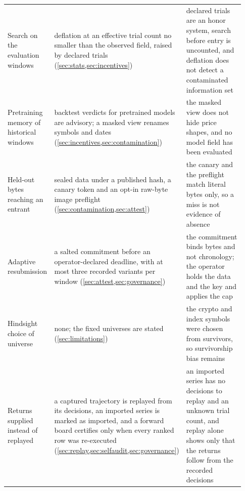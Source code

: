 \begin{table}[t]
\begin{tabular}{>{\raggedright\arraybackslash}p{0.2\linewidth}>{\raggedright\arraybackslash}p{0.37\linewidth}>{\raggedright\arraybackslash}p{0.36\linewidth}}
Search on the evaluation windows & deflation at an effective trial count no smaller than the observed field, raised by declared trials (\cref{sec:stats,sec:incentives}) & declared trials are an honor system, search before entry is uncounted, and deflation does not detect a contaminated information set \citep[p.~7]{gencay2026survives} \\[2pt]
Pretraining memory of historical windows & backtest verdicts for pretrained models are advisory; a masked view renames symbols and dates (\cref{sec:incentives,sec:contamination}) & the masked view does not hide price shapes, and no model field has been evaluated \\[2pt]
Held-out bytes reaching an entrant & sealed data under a published hash, a canary token and an opt-in raw-byte image preflight (\cref{sec:contamination,sec:attest}) & the canary and the preflight match literal bytes only, so a miss is not evidence of absence \\[2pt]
Adaptive resubmission & a salted commitment before an operator-declared deadline, with at most three recorded variants per window (\cref{sec:attest,sec:governance}) & the commitment binds bytes and not chronology; the operator holds the data and the key and applies the cap \\[2pt]
Hindsight choice of universe & none; the fixed universes are stated (\cref{sec:limitations}) & the crypto and index symbols were chosen from survivors, so survivorship bias remains \\[2pt]
Returns supplied instead of replayed & a captured trajectory is replayed from its decisions, an imported series is marked as imported, and a forward board certifies only when every ranked row was re-executed (\cref{sec:replay,sec:selfaudit,sec:governance}) & an imported series has no decisions to replay and an unknown trial count, and replay alone shows only that the returns follow from the recorded decisions \\
\bottomrule
\end{tabular}
\end{table}

